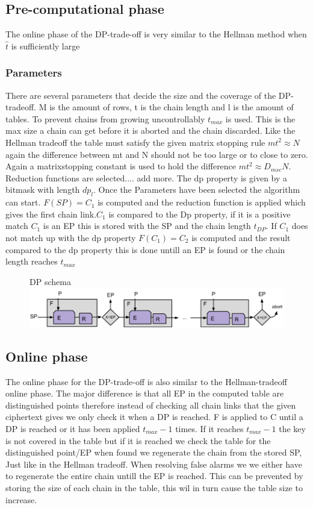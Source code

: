 \subsection{Pre-computational phase}
The online phase of the DP-trade-off is very similar to the Hellman method when $\hat{t}$ is sufficiently large
\subsubsection{Parameters}
There are several parameters that decide the size and the coverage of
the DP-tradeoff. M is the amount of rows, t is the chain length  and l is the amount of tables.
To prevent chains from growing uncontrollably $t_{max}$ is used. This is the max size a chain can get before it is aborted and the chain discarded.
Like the Hellman tradeoff the table must satisfy the
given matrix stopping rule $mt^2\approx N$ again the difference between
mt and N should not be too large or to close to zero. Again a
matrixstopping constant is used to hold the difference $mt^2\approx
D_{msc}N$. Reduction functions are selected.... add more. The dp property is given by a bitmask with length $dp_l$.
Once the Parameters have been selected the algorithm can start. $F(SP)=C_1$ is computed and the reduction function is applied which gives the first chain link.$C_1$ is compared to the Dp property, if it is a positive match $C_1$ is an EP this is stored with the SP and the chain length $t_{DP}$. If $C_1$ does not match up with the dp property $F(C_1)=C_2$ is computed and the result compared to the dp property this is done untill an EP is found or the chain length reaches $t_{max}$
\begin{figure}[th]
  DP schema
  \includegraphics[width=\textwidth]{figures/DPSchema.png}
  \centering
\end{figure}
\subsection{Online phase}
The online phase for the DP-trade-off is also similar to the Hellman-tradeoff online phase. The major difference is that all EP in the computed table are distinguished points therefore instead of checking all chain links that the given ciphertext gives we only check it when a DP is reached. F is applied to C until a DP is reached or it has been applied $t_{max}-1$ times. If it reaches $t_{max}-1$ the key is not covered in the table but if it is reached we check the table for the distinguished point/EP when found we regenerate the chain from the stored SP, Just like in the Hellman tradeoff. When resolving false alarms we we either have to regenerate the entire chain untill the EP is reached. This can be prevented by storing the size of each chain in the table, this wil in turn cause the table size to increase.


